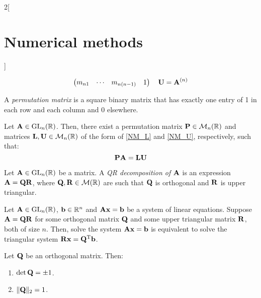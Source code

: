 \documentclass[../../../main.tex]{subfiles}
\begin{document}
\begin{multicols}{2}[\section{Numerical methods}]
\begin{prop}
\begin{enumerate}
$$\begin{pmatrix}
                          m_{n1} & \cdots & m_{n(n-1)} & 1
                      \end{pmatrix}\quad
                      \boldsymbol{\mathrm{U}}=\boldsymbol{\mathrm{A}}^{(n)}
                  $$
        \end{enumerate}
    \end{prop}
    \begin{definition}
        A \textit{permutation matrix} is a square binary matrix that has exactly one entry of 1 in each row and each column and 0 elsewhere.
    \end{definition}
    \begin{prop}
        Let $\boldsymbol{\mathrm{A}}\in\mathrm{GL}_n(\mathbb{R})$. Then, there exist a permutation matrix $\boldsymbol{\mathrm{P}}\in\mathcal{M}_n(\mathbb{R})$ and matrices $\boldsymbol{\mathrm{L}},\boldsymbol{\mathrm{U}}\in\mathcal{M}_n(\mathbb{R})$ of the form of \eqref{NM_L} and \eqref{NM_U}, respectively, such that: $$\boldsymbol{\mathrm{P}}\boldsymbol{\mathrm{A}}=\boldsymbol{\mathrm{L}}\boldsymbol{\mathrm{U}}$$
    \end{prop}
    \begin{definition}[QR descompostion]
        Let $\boldsymbol{\mathrm{A}}\in\mathrm{GL}_n(\mathbb{R})$ be a matrix. A \textit{QR decomposition of $\boldsymbol{\mathrm{A}}$} is an expression $\boldsymbol{\mathrm{A}}=\boldsymbol{\mathrm{Q}}\boldsymbol{\mathrm{R}}$, where $\boldsymbol{\mathrm{Q}},\boldsymbol{\mathrm{R}}\in\mathcal{M}(\mathbb{R})$ are such that $\boldsymbol{\mathrm{Q}}$ is orthogonal and $\boldsymbol{\mathrm{R}}$ is upper triangular.
    \end{definition}
    \begin{lemma}
        Let $\boldsymbol{\mathrm{A}}\in\mathrm{GL}_n(\mathbb{R})$, $\boldsymbol{\mathrm{b}}\in\mathbb{R}^n$ and $\boldsymbol{\mathrm{A}}\boldsymbol{\mathrm{x}}=\boldsymbol{\mathrm{b}}$ be a system of linear equations. Suppose $\boldsymbol{\mathrm{A}}=\boldsymbol{\mathrm{Q}}\boldsymbol{\mathrm{R}}$ for some orthogonal matrix $\boldsymbol{\mathrm{Q}}$ and some upper triangular matrix $\boldsymbol{\mathrm{R}}$, both of size $n$. Then, solve the system $\boldsymbol{\mathrm{A}}\boldsymbol{\mathrm{x}}=\boldsymbol{\mathrm{b}}$ is equivalent to solve the triangular system $\boldsymbol{\mathrm{R}}\boldsymbol{\mathrm{x}}=\vb{Q}^{\mathrm{T}}\boldsymbol{\mathrm{b}}$.
    \end{lemma}
    \begin{lemma}
        Let $\boldsymbol{\mathrm{Q}}$ be an orthogonal matrix. Then:
        \begin{enumerate}
            \item $\det\boldsymbol{\mathrm{Q}}=\pm 1$.
            \item $\|\boldsymbol{\mathrm{Q}}\|_2=1$.
        \end{enumerate}
    \end{lemma}
\end{multicols}
\end{document}
